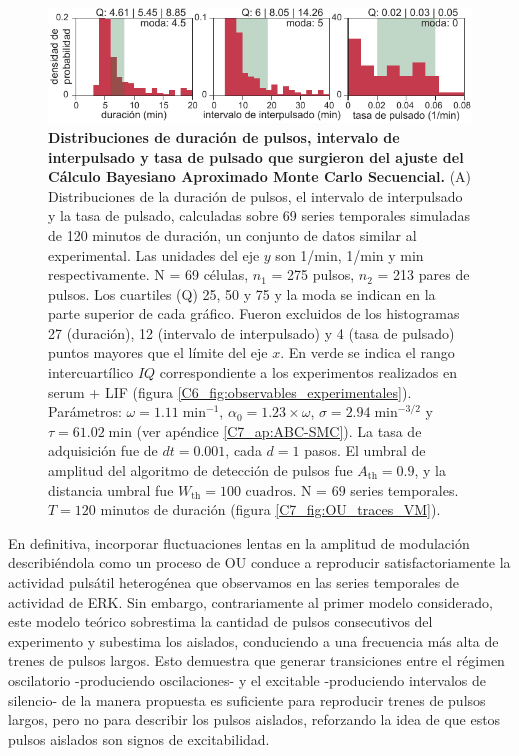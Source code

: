 \documentclass[./main.tex]{subfiles}
\begin{document}
\begin{figure}
    \centering
    \includegraphics[width=1\columnwidth]{figures/chapter7/C7_OU_validation_hist.pdf} 
    \caption{\textbf{Distribuciones de duración de pulsos, intervalo de interpulsado y tasa de pulsado que surgieron del ajuste del Cálculo Bayesiano Aproximado Monte Carlo Secuencial.} (A) Distribuciones de la duración de pulsos, el intervalo de interpulsado y la tasa de pulsado, calculadas sobre 69 series temporales simuladas de 120 minutos de duración, un conjunto de datos similar al experimental. Las unidades del eje $y$ son 1/min, 1/min y min respectivamente. N = 69 células, $n_1$ = 275 pulsos, $n_2$ = 213 pares de pulsos. Los cuartiles (Q) 25, 50 y 75 y la moda se indican en la parte superior de cada gráfico. Fueron excluidos de los histogramas 27 (duración), 12 (intervalo de interpulsado) y 4 (tasa de pulsado) puntos mayores que el límite del eje $x$. En verde se indica el rango intercuartílico $IQ$ correspondiente a los experimentos realizados en serum + LIF (figura \ref{C6_fig:observables_experimentales}). Parámetros: $\omega = 1.11\; \text{min}^{-1}$, $\alpha_0 = 1.23 \times \omega$, $ \sigma = 2.94 \; \text{min}^{-3/2}$ y $\tau = 61.02 \; \text{min} $ (ver apéndice \ref{C7_ap:ABC-SMC}). La tasa de adquisición fue de $dt = 0.001$, cada $d = 1$ pasos. El umbral de amplitud del algoritmo de detección de pulsos fue $A_{\text{th}} = 0.9$, y la distancia umbral fue $W_{\text{th}} = 100\text{ cuadros}$. N = $69$ series temporales. $T = 120$ minutos de duración (figura \ref{C7_fig:OU_traces_VM}).}
    \label{C7_fig:OU_param_evaluation_hist}
\end{figure} 


En definitiva, incorporar fluctuaciones lentas en la amplitud de modulación describiéndola como un proceso de OU conduce a reproducir satisfactoriamente la actividad pulsátil heterogénea que observamos en las series temporales de actividad de ERK. Sin embargo, contrariamente al primer modelo considerado, este modelo teórico sobrestima la cantidad de pulsos consecutivos del experimento y subestima los aislados, conduciendo a una frecuencia más alta de trenes de pulsos largos. Esto demuestra que generar transiciones entre el régimen oscilatorio -produciendo oscilaciones- y el excitable -produciendo intervalos de silencio- de la manera propuesta es suficiente para reproducir trenes de pulsos largos, pero no para describir los pulsos aislados, reforzando la idea de que estos pulsos aislados son signos de excitabilidad. 
\end{document}
